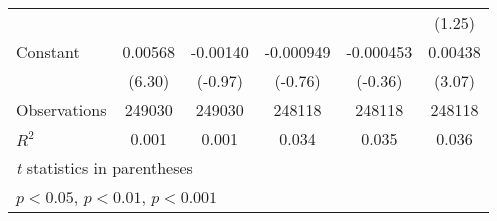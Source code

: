 {\begin{tabular}{l*{5}{c}}
                &                  &                  &                  &                  &   (1.25)         \\
[1em]
Constant        &  0.00568\sym{***}& -0.00140         &-0.000949         &-0.000453         &  0.00438\sym{**} \\
                &   (6.30)         &  (-0.97)         &  (-0.76)         &  (-0.36)         &   (3.07)         \\
\hline
Observations    &   249030         &   249030         &   248118         &   248118         &   248118         \\
\(R^{2}\)       &    0.001         &    0.001         &    0.034         &    0.035         &    0.036         \\
\hline\hline
\multicolumn{6}{l}{\footnotesize \textit{t} statistics in parentheses}\\
\multicolumn{6}{l}{\footnotesize \sym{*} \(p<0.05\), \sym{**} \(p<0.01\), \sym{***} \(p<0.001\)}\\
\end{tabular}
}
